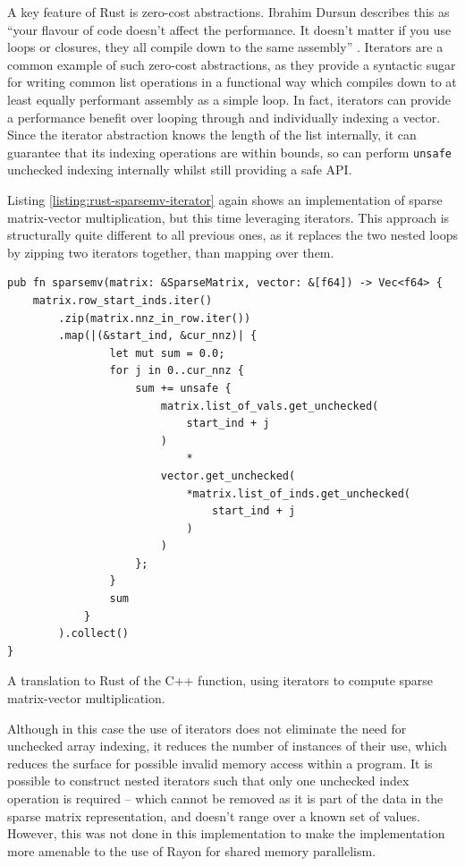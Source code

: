 A key feature of Rust is zero-cost abstractions. Ibrahim Dursun describes this as ``your flavour of code doesn’t affect the performance. It doesn’t matter if you use loops or closures, they all compile down to the same assembly'' \cite{RustZeroCost2020}. Iterators are a common example of such zero-cost abstractions, as they provide a syntactic sugar for writing common list operations in a functional way which compiles down to at least equally performant assembly as a simple loop. In fact, iterators can provide a performance benefit over looping through and individually indexing a vector. Since the iterator abstraction knows the length of the list internally, it can guarantee that its indexing operations are within bounds, so can perform \texttt{unsafe} unchecked indexing internally whilst still providing a safe API.

Listing \ref{listing:rust-sparsemv-iterator} again shows an implementation of sparse matrix-vector multiplication, but this time leveraging iterators. This approach is structurally quite different to all previous ones, as it replaces the two nested loops by zipping two iterators together, than mapping over them.

\begin{listing}[H]
    \begin{verbatim}
pub fn sparsemv(matrix: &SparseMatrix, vector: &[f64]) -> Vec<f64> {
    matrix.row_start_inds.iter()
        .zip(matrix.nnz_in_row.iter())
        .map(|(&start_ind, &cur_nnz)| {
                let mut sum = 0.0;
                for j in 0..cur_nnz {
                    sum += unsafe {
                        matrix.list_of_vals.get_unchecked(
                            start_ind + j
                        )
                            *
                        vector.get_unchecked(
                            *matrix.list_of_inds.get_unchecked(
                                start_ind + j
                            )
                        )
                    };
                }
                sum
            }
        ).collect()
}
    \end{verbatim}
    \caption{A translation to Rust of the C++ function, using iterators to compute sparse matrix-vector multiplication.}
    \label{listing:rust-sparsemv-iterator}
\end{listing}

Although in this case the use of iterators does not eliminate the need for unchecked array indexing, it reduces the number of instances of their use, which reduces the surface for possible invalid memory access within a program. It is possible to construct nested iterators such that only one unchecked index operation is required -- which cannot be removed as it is part of the data in the sparse matrix representation, and doesn't range over a known set of values. However, this was not done in this implementation to make the implementation more amenable to the use of Rayon for shared memory parallelism.

